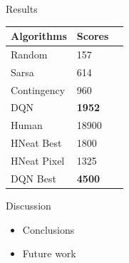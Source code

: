 \documentclass[final]{beamer}
\newlength{\onecolwid}
\begin{document}
\begin{frame}[t]
\begin{columns}[t]
\begin{column}{\onecolwid}
\begin{block}{Results}
\begin{table}
    \vspace{2ex}
    \begin{tabular}{l l l}
        \toprule
            \textbf{Algorithms} & \textbf{Scores} \\
        \midrule
            Random & 157 \\
            Sarsa & 614 \\
            Contingency & 960 \\
            DQN & \textbf{1952} \\
            Human & 18900 \\
        \midrule
            HNeat Best & 1800 \\
            HNeat Pixel & 1325 \\
            DQN Best & \textbf{4500} \\
        \bottomrule
    \end{tabular}
\end{table}

\end{block}


\begin{block}{Discussion}

    \begin{itemize}
        \item Conclusions
        \item Future work
    \end{itemize}

\end{block}


\end{column} %

\end{columns} %

\end{frame} %
\end{document}
